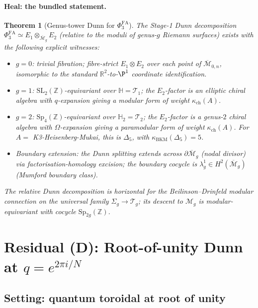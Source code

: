 \documentclass[11pt]{article}
\newtheorem{theorem}{Theorem}[section]
\newcommand{\Eone}{E_{1}}
\newcommand{\Etwo}{E_{2}}
\newcommand{\PhiFA}{\Phi^{\mathrm{FA}}}
\newcommand{\R}{\mathbb{R}}
\newcommand{\Z}{\mathbb{Z}}
\newcommand{\cM}{\mathcal{M}}
\newcommand{\cT}{\mathcal{T}}
\begin{document}
\paragraph{Heal: the bundled statement.}
\begin{theorem}[Genus-tower Dunn for $\PhiFA_3$]
  \label{thm:genus-tower-dunn}
  The Stage-1 Dunn decomposition
  $\PhiFA_3 \simeq \Eone \otimes_{\overline{\cM}_g} \Etwo$ (relative to
  the moduli of genus-$g$ Riemann surfaces) exists with the following
  explicit witnesses:
  \begin{itemize}
  \item \emph{$g = 0$:} trivial fibration; fibre-strict $\Eone \otimes
    \Etwo$ over each point of $\overline{\cM}_{0, n}$, isomorphic to
    the standard $\R^2$-to-$\P^1$ coordinate identification.
  \item \emph{$g = 1$:} $\mathrm{SL}_2(\Z)$-equivariant over $\mathbb H
    = \cT_1$; the $\Etwo$-factor is an elliptic chiral algebra with
    $q$-expansion giving a modular form of weight
    $\kappa_{\mathrm{ch}}(A)$.
  \item \emph{$g = 2$:} $\mathrm{Sp}_4(\Z)$-equivariant over
    $\mathbb H_2 = \cT_2$; the $\Etwo$-factor is a genus-$2$ chiral
    algebra with $\Omega$-expansion giving a paramodular form of
    weight $\kappa_{\mathrm{ch}}(A)$. For $A = $ K3-Heisenberg-Mukai,
    this is $\Delta_5$, with $\kappa_{\mathrm{BKM}}(\Delta_5) = 5$.
  \item \emph{Boundary extension:} the Dunn splitting extends across
    $\partial\overline{\cM}_g$ (nodal divisor) via
    factorisation-homology excision; the boundary cocycle is
    $\lambda_g^1 \in H^2(\overline{\cM}_g)$ (Mumford boundary class).
  \end{itemize}
  The relative Dunn decomposition is horizontal for the
  Beilinson--Drinfeld modular connection on the universal family
  $\Sigma_g \to \cT_g$; its descent to $\cM_g$ is modular-equivariant
  with cocycle $\mathrm{Sp}_{2g}(\Z)$.
\end{theorem}

\section{Residual (D): Root-of-unity Dunn at $q = e^{2\pi i/N}$}
\label{sec:residual-D-root-of-unity}

\subsection{Setting: quantum toroidal at root of unity}
\end{document}
